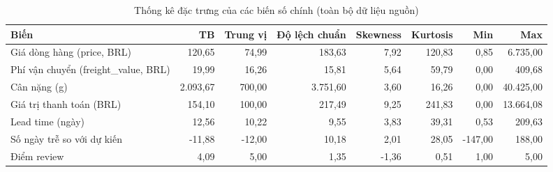 \begin{table}[htbp]\centering\scriptsize\caption{Thống kê đặc trưng của các biến số chính (toàn bộ dữ liệu nguồn)}\label{tab:describe}
\begin{tabular}{p{4.3cm}rrrrrrr}\toprule
\textbf{Biến} & \textbf{TB} & \textbf{Trung vị} & \textbf{Độ lệch chuẩn} & \textbf{Skewness} & \textbf{Kurtosis} & \textbf{Min} & \textbf{Max}\\\midrule
Giá dòng hàng (price, BRL) & 120,65 & 74,99 & 183,63 & 7,92 & 120,83 & 0,85 & 6.735,00\\
Phí vận chuyển (freight\_value, BRL) & 19,99 & 16,26 & 15,81 & 5,64 & 59,79 & 0,00 & 409,68\\
Cân nặng (g) & 2.093,67 & 700,00 & 3.751,60 & 3,60 & 16,26 & 0,00 & 40.425,00\\
Giá trị thanh toán (BRL) & 154,10 & 100,00 & 217,49 & 9,25 & 241,83 & 0,00 & 13.664,08\\
Lead time (ngày) & 12,56 & 10,22 & 9,55 & 3,83 & 39,31 & 0,53 & 209,63\\
Số ngày trễ so với dự kiến & -11,88 & -12,00 & 10,18 & 2,01 & 28,05 & -147,00 & 188,00\\
Điểm review & 4,09 & 5,00 & 1,35 & -1,36 & 0,51 & 1,00 & 5,00\\
\bottomrule\end{tabular}\end{table}
